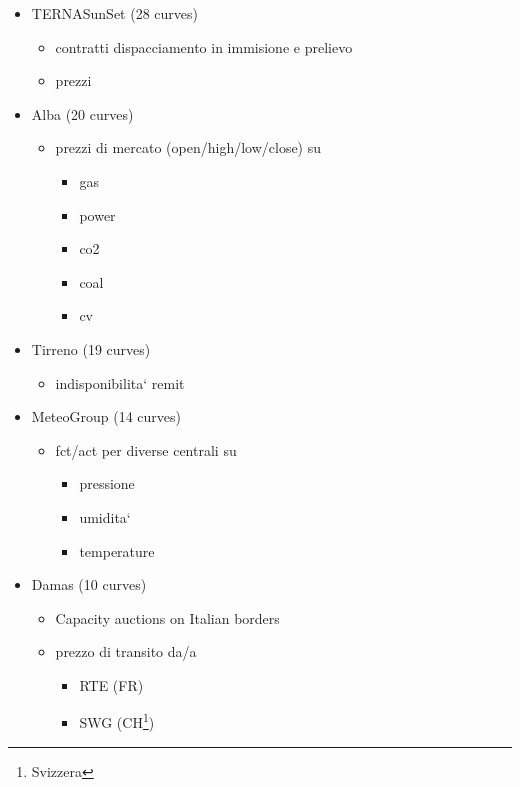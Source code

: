 \begin{itemize}
    \item TERNASunSet (28 curves)
        \cite{bib:terna_sunset:url}
        \begin{itemize}
            \item contratti dispacciamento in immisione e prelievo
            \item prezzi
        \end{itemize}
    \item Alba (20 curves)
        \begin{itemize}
            \item prezzi di mercato (open/high/low/close) su
                \begin{itemize}
                    \item gas
                    \item power
                    \item co2
                    \item coal
                    \item cv
                \end{itemize}
        \end{itemize}
    \item Tirreno (19 curves)
        \begin{itemize}
            \item indisponibilita` remit
        \end{itemize}
    \item MeteoGroup (14 curves)
        \begin{itemize}
            \item fct/act per diverse centrali su
                \begin{itemize}
                    \item pressione
                    \item umidita`
                    \item temperature
                \end{itemize}
        \end{itemize}
    \item Damas (10 curves)
        \begin{itemize}
            \item Capacity auctions on Italian borders
            \item prezzo di transito da/a
                \begin{itemize}
                    \item RTE (FR)
                    \item SWG (CH\footnote{Svizzera})

\end{itemize}
\end{itemize}
\end{itemize}
